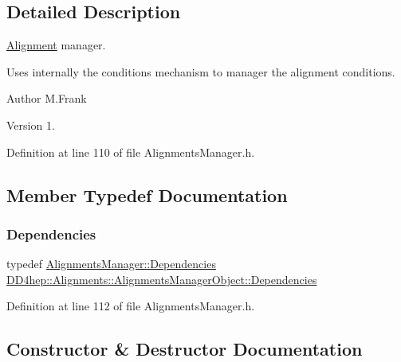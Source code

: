 \subsection{Detailed Description}
\hyperlink{class_d_d4hep_1_1_alignments_1_1_alignment}{Alignment} manager. 

Uses internally the conditions mechanism to manager the alignment conditions.

\begin{DoxyAuthor}{Author}
M.\+Frank 
\end{DoxyAuthor}
\begin{DoxyVersion}{Version}
1. 
\end{DoxyVersion}


Definition at line 110 of file Alignments\+Manager.\+h.



\subsection{Member Typedef Documentation}
\hypertarget{class_d_d4hep_1_1_alignments_1_1_alignments_manager_object_a833ee244e731bbe8cf28bb209181dabc}{}\label{class_d_d4hep_1_1_alignments_1_1_alignments_manager_object_a833ee244e731bbe8cf28bb209181dabc} 
\subsubsection{\texorpdfstring{Dependencies}{Dependencies}}
{\footnotesize\ttfamily typedef \hyperlink{class_d_d4hep_1_1_alignments_1_1_alignments_manager_ae8068cb8b252db1243c87eccad69e980}{Alignments\+Manager\+::\+Dependencies} \hyperlink{class_d_d4hep_1_1_alignments_1_1_alignments_manager_object_a833ee244e731bbe8cf28bb209181dabc}{D\+D4hep\+::\+Alignments\+::\+Alignments\+Manager\+Object\+::\+Dependencies}}



Definition at line 112 of file Alignments\+Manager.\+h.



\subsection{Constructor \& Destructor Documentation}
\hypertarget{class_d_d4hep_1_1_alignments_1_1_alignments_manager_object_a8fb4e0202704fdcf8101a42494deca7b}{}\label{class_d_d4hep_1_1_alignments_1_1_alignments_manager_object_a8fb4e0202704fdcf8101a42494deca7b} 
